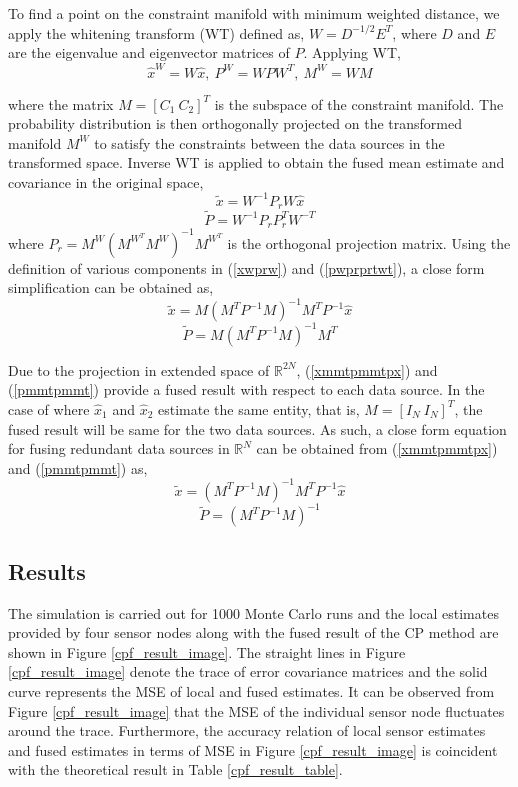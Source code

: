 \documentclass{ieeeaccess}
\begin{document}
To find a point on the constraint manifold with minimum weighted distance, we apply the whitening transform (WT) defined as, $W=D^{-1/2}E^T$, where $D$ and $E$ are the eigenvalue and eigenvector matrices of $P$. Applying WT,
\begin{equation}
\hat{x}^W=W\hat{x},\ P^W=WPW^T,\ M^W=WM
\end{equation}

where the matrix $M = [C_1\ C_2]^T$ is the subspace of the constraint manifold. The probability
distribution is then orthogonally projected on the transformed manifold $M^W$ to satisfy the constraints
between the data sources in the transformed space. Inverse WT is applied to
obtain the fused mean estimate and covariance in the original space,
\begin{equation}
\label{xwprw}
\tilde{x}=W^{-1}P_r W\hat{x}
\end{equation}
\begin{equation}
\label{pwprprtwt}
\tilde{P}=W^{-1}P_r P_{r}^{T}W^{-T}
\end{equation}
where $P_r=M^W(M^{W^T}M^W)^{-1}M^{W^T}$ is the orthogonal projection matrix. Using the definition of various
components in (\ref{xwprw}) and (\ref{pwprprtwt}), a close form simplification can be obtained as,
\begin{equation}
\label{xmmtpmmtpx}
\tilde{x}=M(M^TP^{-1}M)^{-1}M^TP^{-1}\hat{x}
\end{equation}
\begin{equation}
\label{pmmtpmmt}
\tilde{P}=M(M^TP^{-1}M)^{-1}M^T
\end{equation}

Due to the projection in extended space of $\mathbb{R}^{2N}$, (\ref{xmmtpmmtpx}) and (\ref{pmmtpmmt}) provide a fused result with respect to each data source. In the case of where $\hat{x}_1$ and $\hat{x}_2$ estimate the same entity, that is, $M=[I_N\ I_N]^T$, the fused result will be same for the two data sources. As such, a close form equation for fusing redundant data sources in $\mathbb{R}^N$ can be obtained from (\ref{xmmtpmmtpx}) and (\ref{pmmtpmmt}) as,
\begin{equation}
\tilde{x}=(M^TP^{-1}M)^{-1}M^TP^{-1}\hat{x}
\end{equation}
\begin{equation}
\tilde{P}=(M^TP^{-1}M)^{-1}
\end{equation}
\subsection{Results}
The simulation is carried out for 1000 Monte Carlo runs and the local estimates provided by four
sensor nodes along with the fused result of the CP method are shown in Figure \ref{cpf_result_image}. The straight lines
in Figure \ref{cpf_result_image} denote the trace of error covariance matrices and the solid curve represents the MSE of
local and fused estimates. It can be observed from Figure \ref{cpf_result_image} that the MSE of the individual sensor node fluctuates around the trace. Furthermore, the accuracy relation of
local sensor estimates and fused estimates in terms of MSE in Figure \ref{cpf_result_image} is coincident with the
theoretical result in Table \ref{cpf_result_table}.
\end{document}
